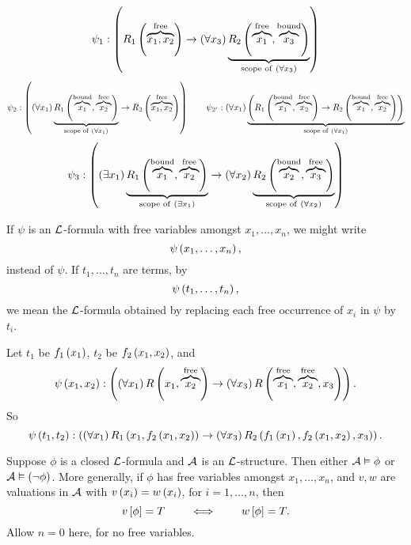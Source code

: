 \begin{example2}
$$ \psi_1 : \impb{R_1\rb{\overbrace{x_1, x_2}^{\text{free}}}}{\fab{x_3}\underbrace{R_2\rb{\overbrace{x_1}^{\text{free}}, \overbrace{x_3}^{\text{bound}}}}_{\text{scope of} \ \fab{x_3}}} $$
$$ \psi_2 : \impb{\fab{x_1}\underbrace{R_1\rb{\overbrace{x_1}^{\text{bound}}, \overbrace{x_2}^{\text{free}}}}_{\text{scope of} \ \fab{x_1}}}{R_2\rb{\overbrace{x_1, x_2}^{\text{free}}}} \qquad \psi_{2'} : \fab{x_1}\underbrace{\impb{R_1\rb{\overbrace{x_1}^{\text{bound}}, \overbrace{x_2}^{\text{free}}}}{R_2\rb{\overbrace{x_1}^{\text{bound}}, \overbrace{x_2}^{\text{free}}}}}_{\text{scope of} \ \fab{x_1}} $$
$$ \psi_3 : \impb{\teb{x_1}\underbrace{R_1\rb{\overbrace{x_1}^{\text{bound}}, \overbrace{x_2}^{\text{free}}}}_{\text{scope of} \ \teb{x_1}}}{\fab{x_2}\underbrace{R_2\rb{\overbrace{x_2}^{\text{bound}}, \overbrace{x_3}^{\text{free}}}}_{\text{scope of} \ \fab{x_2}}} $$
\end{example2}

\begin{definition}
If $ \psi $ is an $ \LL $-formula with free variables amongst $ x_1, \dots, x_n $, we might write
$$ \psi\rb{x_1, \dots, x_n}, $$
instead of $ \psi $. If $ t_1, \dots, t_n $ are terms, by
$$ \psi\rb{t_1, \dots, t_n}, $$
we mean the $ \LL $-formula obtained by replacing each free occurrence of $ x_i $ in $ \psi $ by $ t_i $.
\end{definition}

\begin{example2}
Let $ t_1 $ be $ f_1\rb{x_1} $, $ t_2 $ be $ f_2\rb{x_1, x_2} $, and
$$ \psi\rb{x_1, x_2} : \impb{\fab{x_1}R\rb{x_1, \overbrace{x_2}^{\text{free}}}}{\fab{x_3}R\rb{\overbrace{x_1}^{\text{free}}, \overbrace{x_2}^{\text{free}}, x_3}}. $$
So
$$ \psi\rb{t_1, t_2} : \impb{\fab{x_1}R_1\rb{x_1, f_2\rb{x_1, x_2}}}{\fab{x_3}R_2\rb{f_1\rb{x_1}, f_2\rb{x_1, x_2}, x_3}}. $$
\end{example2}

\pagebreak

\begin{theorem}
\label{thm:2.3.3}
Suppose $ \phi $ is a closed $ \LL $-formula and $ \AA $ is an $ \LL $-structure. Then either $ \AA \vDash \phi $ or $ \AA \vDash \notb{\phi} $. More generally, if $ \phi $ has free variables amongst $ x_1, \dots, x_n $, and $ v, w $ are valuations in $ \AA $ with $ v\rb{x_i} = w\rb{x_i} $, for $ i = 1, \dots, n $, then
$$ v\sb{\phi} = T \qquad \iff \qquad w\sb{\phi} = T. $$
Allow $ n = 0 $ here, for no free variables.
\end{theorem}

